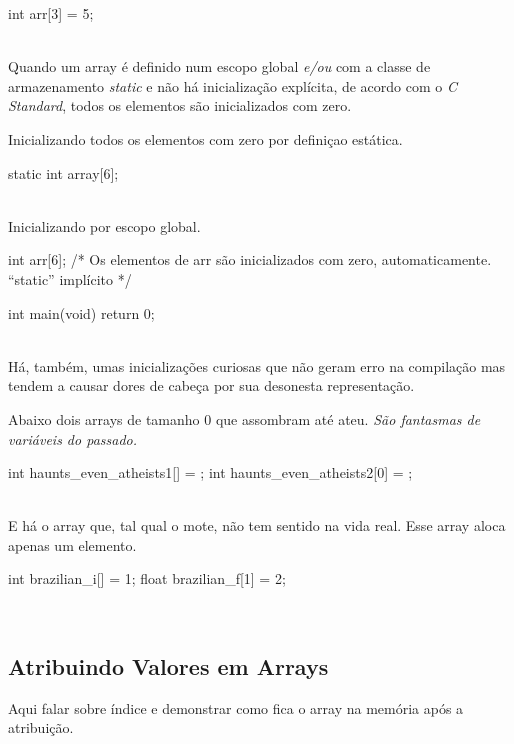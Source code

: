 \begin{ccode}
  int arr[3] = {5};
\end{ccode}
\\

Quando um array é definido num escopo global \textit{e/ou} com a classe de armazenamento \textit{static} e não há inicialização explícita, de acordo com o \textit{C Standard}, todos os elementos são inicializados com zero.

Inicializando todos os elementos com zero por definiçao estática.

\begin{ccode}
  static int array[6];
\end{ccode}
\\

Inicializando por escopo global.

\begin{ccode}
int arr[6];    /* Os elementos de arr são inicializados
                  com zero, automaticamente.
                  ``static'' implícito */

int main(void)
{
  return 0;
}
\end{ccode}
\\

Há, também, umas inicializações curiosas que não geram erro na compilação mas tendem a causar dores de cabeça por sua desonesta representação.

Abaixo dois arrays  de tamanho 0 que assombram até ateu. \textit{São fantasmas de variáveis do passado.}

\begin{ccode}
  int haunts_even_atheists1[] = {};
  int haunts_even_atheists2[0] = {};
\end{ccode}
\\

E há o array  que, tal qual o mote, não tem sentido na vida real. Esse array aloca apenas um elemento.

\begin{ccode}
  int brazilian_i[] = {1};
  float brazilian_f[1] = {2};
\end{ccode}
\\

\subsection{Atribuindo Valores em Arrays}
Aqui falar sobre índice e demonstrar como fica o array na memória após a atribuição.

